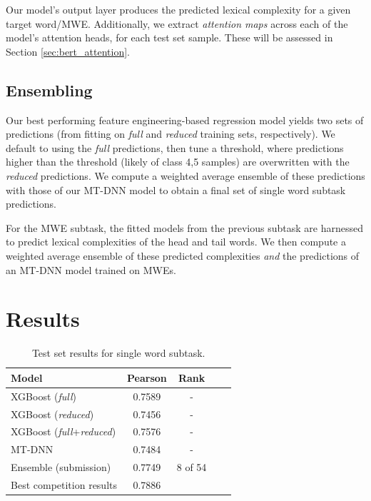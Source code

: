 \documentclass[11pt,a4paper]{article}
\begin{document}
Our model's output layer produces the predicted lexical complexity for a given target word/MWE. Additionally, we extract \textit{attention maps} across each of the model's attention heads, for each test set sample. These will be assessed in Section \ref{sec:bert_attention}.

\subsection{Ensembling}

Our best performing feature engineering-based regression model yields two sets of predictions (from fitting on \textit{full} and \textit{reduced} training sets, respectively). We default to using the \textit{full} predictions, then tune a threshold, where predictions higher than the threshold (likely of class 4,5 samples) are overwritten with the \textit{reduced} predictions. We compute a weighted average ensemble of these predictions with those of our MT-DNN model to obtain a final set of single word subtask predictions. 

For the MWE subtask, the fitted models from the previous subtask are harnessed to predict lexical complexities of the head and tail words. We then compute a weighted average ensemble of these predicted complexities \textit{and} the predictions of an MT-DNN model trained on MWEs.

\section{Results}

\begin{table}
  \centering
  \begin{tabular}{lcccc}
  \hline \textbf{Model} & \textbf{Pearson} & \textbf{Rank} & \\ \hline
  XGBoost (\textit{full}) &	0.7589 & - \\
  XGBoost (\textit{reduced}) &	0.7456 & - \\
  XGBoost (\textit{full}+\textit{reduced}) & 0.7576 & - \\
  MT-DNN & 0.7484 & - \\
  Ensemble (submission) & 0.7749 & 8 of 54 \\
  \hline
  Best competition results & 0.7886 & \\ 
  \hline
  \end{tabular}
  \caption{\label{tab:single-word-results} Test set results for single word subtask. }
\end{table}
\end{document}
